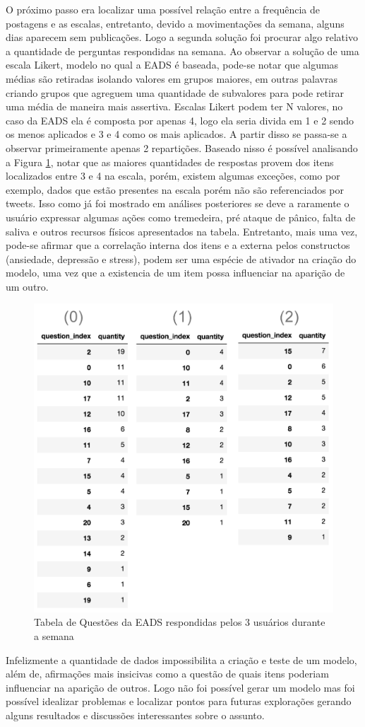 O próximo passo era localizar uma possível relação entre a frequência de postagens e as escalas, entretanto, devido a movimentações da semana, alguns dias aparecem sem publicações. Logo a segunda solução foi procurar algo relativo a quantidade de perguntas respondidas na semana. Ao observar a solução de uma escala Likert, modelo no qual a EADS é baseada, pode-se notar que algumas médias são retiradas isolando valores em grupos maiores, em outras palavras criando grupos que agreguem uma quantidade de subvalores para pode retirar uma média de maneira mais assertiva. Escalas Likert podem ter N valores, no caso da EADS ela é composta por apenas 4, logo ela seria divida em 1 e 2 sendo os menos aplicados e 3 e 4 como os mais aplicados. A partir disso se passa-se a observar primeiramente apenas 2 repartições. Baseado nisso é possível analisando a Figura \ref{fig:table}, notar que as maiores quantidades de respostas provem dos itens localizados entre 3 e 4 na escala, porém, existem algumas exceções, como por exemplo, dados que estão presentes na escala porém não são referenciados por tweets. Isso como já foi mostrado em análises posteriores se deve a raramente o usuário expressar algumas ações como tremedeira, pré ataque de pânico, falta de saliva e outros recursos físicos apresentados na tabela. Entretanto, mais uma vez, pode-se afirmar que a correlação interna dos itens e a externa pelos constructos (ansiedade, depressão e stress), podem ser uma espécie de ativador na criação do modelo, uma vez que a existencia de um item possa influenciar na aparição de um outro.

\begin{figure}[!ht]
    \centering
    \includegraphics[width=.6\textwidth]{imagens/table.png}
    \caption{Tabela de Questões da EADS respondidas pelos 3 usuários durante a semana}
    \label{fig:table}
\end{figure}

Infelizmente a quantidade de dados impossibilita a criação e teste de um modelo, além de, afirmações mais insicivas como a questão de quais itens poderiam influenciar na aparição de outros. Logo não foi possível gerar um modelo mas foi possível idealizar problemas e localizar pontos para futuras explorações gerando alguns resultados e discussões interessantes sobre o assunto.